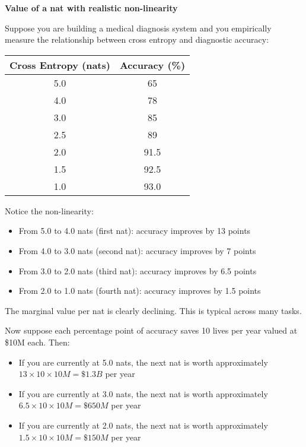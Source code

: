 \begin{examplebox}
\textbf{Value of a nat with realistic non-linearity}

\vspace{0.5em}

Suppose you are building a medical diagnosis system and you empirically measure the relationship between cross entropy and diagnostic accuracy:

\vspace{0.5em}

\begin{center}
\begin{tabular}{cc}
Cross Entropy (nats) & Accuracy (\%) \\
\hline
5.0 & 65 \\
4.0 & 78 \\
3.0 & 85 \\
2.5 & 89 \\
2.0 & 91.5 \\
1.5 & 92.5 \\
1.0 & 93.0 \\
\end{tabular}
\end{center}

\vspace{0.5em}

Notice the non-linearity:
\begin{itemize}
\item From 5.0 to 4.0 nats (first nat): accuracy improves by 13 points
\item From 4.0 to 3.0 nats (second nat): accuracy improves by 7 points
\item From 3.0 to 2.0 nats (third nat): accuracy improves by 6.5 points
\item From 2.0 to 1.0 nats (fourth nat): accuracy improves by 1.5 points
\end{itemize}

The marginal value per nat is clearly declining. This is typical across many tasks.

\vspace{0.5em}

Now suppose each percentage point of accuracy saves 10 lives per year valued at \$10M each. Then:

\begin{itemize}
\item If you are currently at 5.0 nats, the next nat is worth approximately $13 \times 10 \times 10M = \$1.3B$ per year
\item If you are currently at 3.0 nats, the next nat is worth approximately $6.5 \times 10 \times 10M = \$650M$ per year  
\item If you are currently at 2.0 nats, the next nat is worth approximately $1.5 \times 10 \times 10M = \$150M$ per year
\end{itemize}


\end{examplebox}
